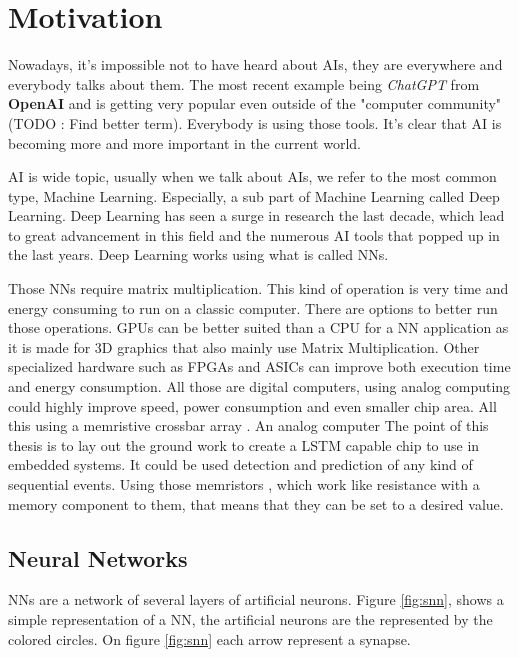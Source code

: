 \section{Motivation}
\label{sec:int_motivation}

Nowadays, it's impossible not to have heard about \acp{AI}, they are everywhere and everybody talks about them. The most recent example being \textit{ChatGPT} from \textbf{OpenAI} and is getting very popular even outside of the "computer community"(TODO : Find better term). Everybody is using those tools. It's clear that \ac{AI} is becoming more and more important in the current world. 

\ac{AI} is wide topic, usually when we talk about \acp{AI}, we refer to the most common type, Machine Learning. Especially, a sub part of Machine Learning called Deep Learning. Deep Learning has seen a surge in research the last decade, which lead to great advancement in this field and the numerous \ac{AI} tools that popped up in the last years.
Deep Learning works using what is called \acp{NN}.

Those \acp{NN} require matrix multiplication. This kind of operation is very time and energy consuming to run on a classic computer. There are options to better run those operations. GPUs can be better suited than a CPU for a \ac{NN} application as it is made for 3D graphics that also mainly use Matrix Multiplication. Other specialized hardware such as FPGAs and ASICs can improve both execution time and energy consumption. All those are digital computers, using analog computing could highly improve speed, power consumption and even smaller chip area. All this using a memristive crossbar array \cite{Xbar}. An analog computer 
The point of this thesis is to lay out the ground work to create a LSTM capable chip to use in embedded systems. It could be used detection and prediction of any kind of sequential events.
Using those memristors \cite{TheoMemristor}, which work like resistance with a memory component to them, that means that they can be set to a desired value.

\subsection{Neural Networks}\label{sec:nn}

\acfp{NN} are a network of several layers of artificial neurons. Figure \ref{fig:snn}, shows a simple representation of a \ac{NN}, the artificial neurons are the represented by the colored circles. On figure \ref{fig:snn} each arrow represent a synapse.

